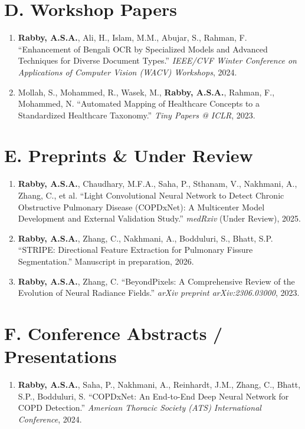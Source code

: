\documentclass[11pt]{article}
\begin{document}
\section*{D. Workshop Papers}
\renewcommand{\theenumi}{W\arabic{enumi}}
\begin{enumerate}
    \item \textbf{Rabby, A.S.A.}, Ali, H., Islam, M.M., Abujar, S., Rahman, F. ``Enhancement of Bengali OCR by Specialized Models and Advanced Techniques for Diverse Document Types.'' \textit{IEEE/CVF Winter Conference on Applications of Computer Vision (WACV) Workshops}, 2024.

    \item Mollah, S., Mohammed, R., Wasek, M., \textbf{Rabby, A.S.A.}, Rahman, F., Mohammed, N. ``Automated Mapping of Healthcare Concepts to a Standardized Healthcare Taxonomy.'' \textit{Tiny Papers @ ICLR}, 2023.
\end{enumerate}

\section*{E. Preprints \& Under Review}
\renewcommand{\theenumi}{P\arabic{enumi}}
\begin{enumerate}
    \item \textbf{Rabby, A.S.A.}, Chaudhary, M.F.A., Saha, P., Sthanam, V., Nakhmani, A., Zhang, C., et al. ``Light Convolutional Neural Network to Detect Chronic Obstructive Pulmonary Disease (COPDxNet): A Multicenter Model Development and External Validation Study.'' \textit{medRxiv} (Under Review), 2025.

    \item \textbf{Rabby, A.S.A.}, Zhang, C., Nakhmani, A., Bodduluri, S., Bhatt, S.P. ``STRIPE: Directional Feature Extraction for Pulmonary Fissure Segmentation.'' Manuscript in preparation, 2026.


    \item \textbf{Rabby, A.S.A.}, Zhang, C. ``BeyondPixels: A Comprehensive Review of the Evolution of Neural Radiance Fields.'' \textit{arXiv preprint arXiv:2306.03000}, 2023.
\end{enumerate}

\section*{F. Conference Abstracts / Presentations}
\renewcommand{\theenumi}{A\arabic{enumi}}
\begin{enumerate}
\item \textbf{Rabby, A.S.A.}, Saha, P., Nakhmani, A., Reinhardt, J.M., Zhang, C., Bhatt, S.P., Bodduluri, S. ``COPDxNet: An End-to-End Deep Neural Network for COPD Detection.'' \textit{American Thoracic Society (ATS) International Conference}, 2024.\end{enumerate}
\end{document}

